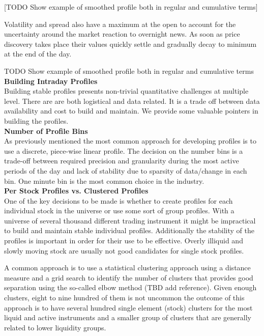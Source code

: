 [TODO Show example of smoothed profile both in regular and cumulative terms]

\par
Volatility and spread also have a maximum at the open to account for the uncertainty around the market reaction to  overnight news. As soon as price discovery takes place their values quickly settle and gradually decay to minimum at the end of the day.

TODO Show example of smoothed profile both in regular and cumulative terms \\

\noindent\textbf{Building Intraday Profiles} \\

Building stable profiles presents non-trivial quantitative challenges at multiple level. There are are both logistical and data related. It is a trade off between data availability and cost to build and maintain. We provide some valuable pointers in building the profiles. \\

\noindent\textbf{Number of Profile Bins} \\

As previously mentioned the most common approach for developing profiles is to use a discrete, piece-wise linear profile. The decision on the number bins is a trade-off between required precision and granularity during the most active periods of the day and lack of stability due to sparsity of data/change in each bin. One minute bin is the most common choice in the industry. \\

\noindent\textbf{Per Stock Profiles vs. Clustered Profiles} \\

One of the key decisions to be made is whether to create profiles for each individual stock in the universe or use some sort of group profiles. With a universe of several thousand different trading instrument it might be impractical to build and maintain stable individual profiles. Additionally the stability of the profiles is important in order for their use to be effective. Overly illiquid and slowly moving stock are usually not good candidates for single stock profiles. 

A common approach is to use a statistical clustering approach using a distance measure and a grid search to identify the number of clusters that provides good separation using the so-called elbow method (TBD add reference). Given enough clusters, eight to nine hundred of them is not uncommon the outcome of this approach is to have several hundred single element (stock) clusters for the most liquid and active instruments and a smaller group of clusters that are generally related to lower liquidity groups.


